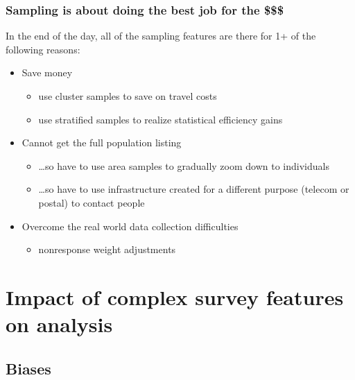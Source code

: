 \documentclass[handout]{beamer}
\begin{document}
\begin{frame}\frametitle{Sampling is about doing the best job for the \$\$\$}

In the end of the day, all of the sampling features are there for 1+ of the following reasons:

\begin{itemize}
    \item Save money
        \begin{itemize}
            \item use cluster samples to save on travel costs
            \item use stratified samples to realize statistical efficiency gains
        \end{itemize}
    \item Cannot get the full population listing
        \begin{itemize}
            \item \ldots so have to use area samples to gradually zoom down to individuals
            \item \ldots so have to use infrastructure created for a different purpose (telecom or postal) to contact people
        \end{itemize}
    \item Overcome the real world data collection difficulties
        \begin{itemize}
            \item nonresponse weight adjustments
        \end{itemize}
\end{itemize}

\end{frame}

\section{Impact of complex survey features on analysis}

\subsection{Biases}
\end{document}
